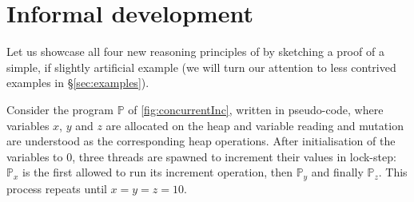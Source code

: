 \section{Informal development}
\label{sec:intuition}

Let us showcase all four new reasoning principles of \colosl by
sketching a proof of a simple, if slightly artificial example (we will
turn our attention to less contrived examples in
\S\ref{sec:examples}).

Consider the program $\mathbb{P}$ of \fig\ref{fig:concurrentInc},
written in pseudo-code, where variables $x$, $y$ and $z$ are allocated
on the heap and variable reading and mutation are understood as the
corresponding heap operations. After initialisation of the variables
to $0$, three threads are spawned to increment their values in
lock-step: $\mathbb{P}_x$ is the first allowed to run its increment
operation, then $\mathbb{P}_y$ and finally $\mathbb{P}_z$. This
process repeats until $x = y = z = 10$.

